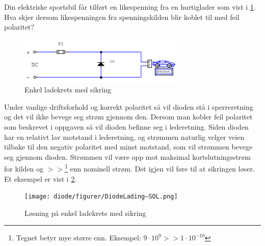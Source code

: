 \begin{question}[name=Oppgave, topic=dioder]
Din elektriske sportsbil får tilført en likespenning fra en hurtiglader som vist i \ref{fig:diodeLading}. Hva skjer dersom likespenningen fra spenningskilden blir koblet til med feil polaritet?
	
	\begin{figure}[H]
		\centering
		\includegraphics[width=0.7\textwidth]{diode/figurer/DiodeLading.png}
		\caption{Enkel ladekrets med sikring}
		\label{fig:diodeLading}
	\end{figure}
	
\end{question}

\vspace{0.5cm} %

\begin{solution}[name=Løsningsforslag oppgave]
	
Under vanlige driftsforhold og korrekt polaritet så vil dioden stå i sperreretning og det vil ikke bevege seg strøm gjennom den. Dersom man kobler feil polaritet som beskrevet i oppgaven så vil dioden befinne seg i lederetning. Siden dioden har en relativt lav motstand i lederetning, og strømmen naturlig velger veien tilbake til den negativ polaritet med minst motstand, som vil strømmen bevege seg gjennom dioden. Strømmen vil være opp mot maksimal kortslutningsstrøm for kilden og $>>$\footnote{Tegnet betyr mye større enn. Eksempel: $9\cdot10^{9}>>1\cdot10^{-10}$} enn nominell strøm. Det igjen vil føre til at sikringen løser. Et eksempel er vist i \ref{fig:diodeLadingSol}.
	\begin{figure}[H]
	\centering
	\texttt{[image: diode/figurer/DiodeLading–SOL.png]}
	\caption{Løsning på enkel ladekrets med sikring}
	\label{fig:diodeLadingSol}
\end{figure}

	
\end{solution}




